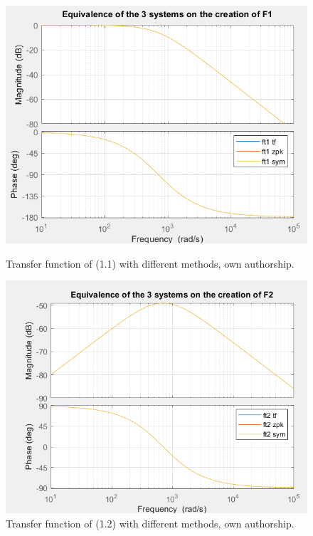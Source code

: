 \documentclass[a4paper,12pt]{article}
\begin{document}
\begin{figure}[H]
    \centering
    \begin{minipage}[b]{0.40\linewidth}
        \centering
        \includegraphics[width=\linewidth]{equivalence f1.png}
        \caption{Transfer function of (1.1) with different methods, own authorship.}
        \label{fig:equivalence-f1}
    \end{minipage}
    \hspace{0.05\linewidth} %
    \begin{minipage}[b]{0.40\linewidth}
        \centering
        \includegraphics[width=\linewidth]{equivalence f2.png}
        \caption{Transfer function of (1.2) with different methods, own authorship.}
        \label{fig:equivalence-f2}
    \end{minipage}
\end{figure}
\end{document}
